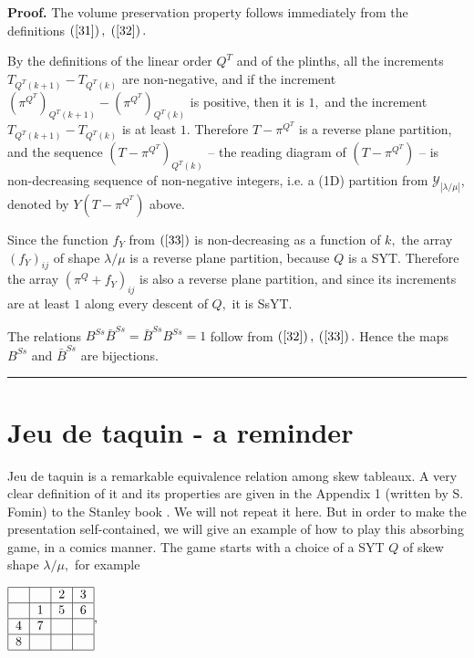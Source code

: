 \documentclass[12pt]{article}%
\newenvironment{proof}[1][Proof]{\noindent\textbf{#1.} }{\ \rule{0.5em}{0.5em}}
\begin{document}
\begin{proof}
The volume preservation property follows immediately from the definitions
$\left(  \ref{31}\right)  ,$ $\left(  \ref{32}\right)  .$

By the definitions of the linear order $Q^{T}$ and of the plinths, all the
increments $T_{Q^{T}\left(  k+1\right)  }-T_{Q^{T}\left(  k\right)  }$ are
non-negative, and if the increment $\left(  \pi^{Q^{T}}\right)  _{Q^{T}\left(
k+1\right)  }-\left(  \pi^{Q^{T}}\right)  _{Q^{T}\left(  k\right)  }$ is
positive, then it is $1,$ and the increment $T_{Q^{T}\left(  k+1\right)
}-T_{Q^{T}\left(  k\right)  }$ is at least $1$. Therefore $T-\pi^{Q^{T}}$ is a
reverse plane partition, and the sequence $\left(  T-\pi^{Q^{T}}\right)
_{Q^{T}\left(  k\right)  }$ -- the reading diagram of $\left(  T-\pi^{Q^{T}%
}\right)  $ -- is non-decreasing sequence of non-negative integers, i.e. a
(1D) partition from $\mathcal{Y}_{\left\vert \lambda/\mu\right\vert }$,
denoted by $Y\left(  T-\pi^{Q^{T}}\right)  $ above.

Since the function $f_{Y}$ from $\left(  \ref{33}\right)  $ is non-decreasing
as a function of $k,$ the array $\left(  f_{Y}\right)  _{ij}$ of shape
$\lambda/\mu$ is a reverse plane partition, because $Q$ is a SYT. Therefore
the array $\left(  \pi^{Q}+f_{Y}\right)  _{ij}$ is also a reverse plane
partition, and since its increments are at least $1$ along every descent of
$Q,$ it is SsYT.

The relations $B^{Ss}\bar{B}^{Ss}=\bar{B}^{Ss}B^{Ss}=1$ follow from $\left(
\ref{32}\right)  ,$ $\left(  \ref{33}\right)  .$ Hence the maps $B^{Ss}$ and
$\bar{B}^{Ss}$ are bijections.
\end{proof}

\section{Jeu de taquin - a reminder}

Jeu de taquin is a remarkable equivalence relation among skew tableaux. A very
clear definition of it and its properties are given in the Appendix 1 (written
by S. Fomin) to the Stanley book \cite{St}. We will not repeat it here. But in
order to make the presentation self-contained, we will give an example of how
to play this absorbing game, in a comics manner. \newline The game starts with
a choice of a SYT $Q$ of skew shape $\lambda/\mu,$ for example

$%
\begin{tabular}
[c]{|l|l|l|l|}\hline
&  & 2 & 3\\\hline
& 1 & 5 & 6\\\hline
4 & 7 &  & \\\hline
8 &  &  & \\\hline
\end{tabular}
,$
\end{document}
